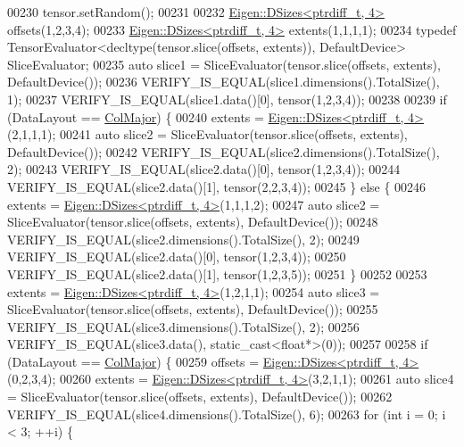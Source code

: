 \begin{DoxyCode}
00230   tensor.setRandom();
00231 
00232   \hyperlink{struct_eigen_1_1_d_sizes}{Eigen::DSizes<ptrdiff\_t, 4>} offsets(1,2,3,4);
00233   \hyperlink{struct_eigen_1_1_d_sizes}{Eigen::DSizes<ptrdiff\_t, 4>} extents(1,1,1,1);
00234   \textcolor{keyword}{typedef} TensorEvaluator<decltype(tensor.slice(offsets, extents)), DefaultDevice> SliceEvaluator;
00235   \textcolor{keyword}{auto} slice1 = SliceEvaluator(tensor.slice(offsets, extents), DefaultDevice());
00236   VERIFY\_IS\_EQUAL(slice1.dimensions().TotalSize(), 1);
00237   VERIFY\_IS\_EQUAL(slice1.data()[0], tensor(1,2,3,4));
00238 
00239   \textcolor{keywordflow}{if} (DataLayout == \hyperlink{group__enums_ggaacded1a18ae58b0f554751f6cdf9eb13a0cbd4bdd0abcfc0224c5fcb5e4f6669a}{ColMajor}) \{
00240     extents = \hyperlink{struct_eigen_1_1_d_sizes}{Eigen::DSizes<ptrdiff\_t, 4>}(2,1,1,1);
00241     \textcolor{keyword}{auto} slice2 = SliceEvaluator(tensor.slice(offsets, extents), DefaultDevice());
00242     VERIFY\_IS\_EQUAL(slice2.dimensions().TotalSize(), 2);
00243     VERIFY\_IS\_EQUAL(slice2.data()[0], tensor(1,2,3,4));
00244     VERIFY\_IS\_EQUAL(slice2.data()[1], tensor(2,2,3,4));
00245   \} \textcolor{keywordflow}{else} \{
00246     extents = \hyperlink{struct_eigen_1_1_d_sizes}{Eigen::DSizes<ptrdiff\_t, 4>}(1,1,1,2);
00247     \textcolor{keyword}{auto} slice2 = SliceEvaluator(tensor.slice(offsets, extents), DefaultDevice());
00248     VERIFY\_IS\_EQUAL(slice2.dimensions().TotalSize(), 2);
00249     VERIFY\_IS\_EQUAL(slice2.data()[0], tensor(1,2,3,4));
00250     VERIFY\_IS\_EQUAL(slice2.data()[1], tensor(1,2,3,5));
00251   \}
00252 
00253   extents = \hyperlink{struct_eigen_1_1_d_sizes}{Eigen::DSizes<ptrdiff\_t, 4>}(1,2,1,1);
00254   \textcolor{keyword}{auto} slice3 = SliceEvaluator(tensor.slice(offsets, extents), DefaultDevice());
00255   VERIFY\_IS\_EQUAL(slice3.dimensions().TotalSize(), 2);
00256   VERIFY\_IS\_EQUAL(slice3.data(), \textcolor{keyword}{static\_cast<}\textcolor{keywordtype}{float}*\textcolor{keyword}{>}(0));
00257 
00258   \textcolor{keywordflow}{if} (DataLayout == \hyperlink{group__enums_ggaacded1a18ae58b0f554751f6cdf9eb13a0cbd4bdd0abcfc0224c5fcb5e4f6669a}{ColMajor}) \{
00259     offsets = \hyperlink{struct_eigen_1_1_d_sizes}{Eigen::DSizes<ptrdiff\_t, 4>}(0,2,3,4);
00260     extents = \hyperlink{struct_eigen_1_1_d_sizes}{Eigen::DSizes<ptrdiff\_t, 4>}(3,2,1,1);
00261     \textcolor{keyword}{auto} slice4 = SliceEvaluator(tensor.slice(offsets, extents), DefaultDevice());
00262     VERIFY\_IS\_EQUAL(slice4.dimensions().TotalSize(), 6);
00263     \textcolor{keywordflow}{for} (\textcolor{keywordtype}{int} i = 0; i < 3; ++i) \{

\end{DoxyCode}
